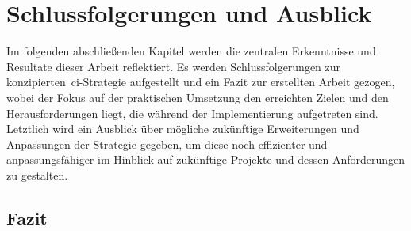 
\section{Schlussfolgerungen und Ausblick} \label{sec:06-prospect}

Im folgenden abschließenden Kapitel werden die zentralen Erkenntnisse und Resultate dieser Arbeit reflektiert.
Es werden Schlussfolgerungen zur konzipierten\ \acrshort{ci}-Strategie aufgestellt und ein Fazit zur erstellten
Arbeit gezogen, wobei der Fokus auf der praktischen Umsetzung den erreichten Zielen und den Herausforderungen liegt,
die während der Implementierung aufgetreten sind.
Letztlich wird ein Ausblick über mögliche zukünftige Erweiterungen und Anpassungen der Strategie gegeben, um diese noch
effizienter und anpassungsfähiger im Hinblick auf zukünftige Projekte und dessen Anforderungen zu gestalten.

\subsection{Fazit} \label{subsec:06-prospect-1}

